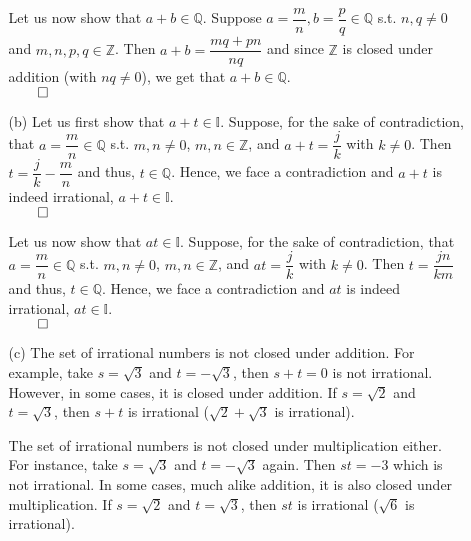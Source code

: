 \documentclass[11pt]{article}
\newcommand{\ints}{\mathbb{Z}}
\newcommand{\rats}{\mathbb{Q}}
\newcommand{\irrats}{\mathbb{I}}
\begin{document}
\begin{itemize}
\begin{itemize}
                Let us now show that $a + b \in \rats$.
                Suppose $a = \dfrac{m}{n}, b = \dfrac{p}{q} \in \rats$ s.t.
                $n, q \neq 0$ and $m, n, p, q \in \ints$. Then $a + b =
                \dfrac{mq + pn}{nq}$ and since $\ints$ is closed under addition
                (with $nq \neq 0$), we get that $a + b \in \rats$.
                \\
                $\qed$

            \item[(b)]
                Let us first show that $a + t \in \irrats$.
                Suppose, for the sake of contradiction, that $a = \dfrac{m}{n}
                \in \rats$ s.t. $m, n \neq 0$, $m, n \in \ints$, and $a + t =
                \dfrac{j}{k}$ with $k \neq 0$. Then $t = \dfrac{j}{k} -
                \dfrac{m}{n}$ and thus, $t \in \rats$. Hence, we face a
                contradiction and $a + t$ is indeed irrational, $a + t \in
                \irrats$.
                \\
                $\qed$

                Let us now show that $at \in \irrats$.
                Suppose, for the sake of contradiction, that $a = \dfrac{m}{n}
                \in \rats$ s.t. $m, n \neq 0$, $m, n \in \ints$, and $at =
                \dfrac{j}{k}$ with $k \neq 0$. Then $t = \dfrac{jn}{km}$
                and thus, $t \in \rats$. Hence, we face a contradiction and
                $at$ is indeed irrational, $at \in \irrats$.
                \\
                $\qed$

            \item[(c)]
                The set of irrational numbers is not closed under addition.
                For example, take $s = \sqrt{3}$ and $t = -\sqrt{3}$, then $s +
                t = 0$ is not irrational. However, in some cases, it is closed
                under addition. If $s = \sqrt{2}$ and $t = \sqrt{3}$, then
                $s + t$ is irrational ($\sqrt{2} + \sqrt{3}$ is irrational).

                The set of irrational numbers is not closed under
                multiplication either. For instance, take $s = \sqrt{3}$ and
                $t = -\sqrt{3}$ again. Then $st = -3$ which is not irrational.
                In some cases, much alike addition, it is also closed under
                multiplication. If $s = \sqrt{2}$ and $t = \sqrt{3}$, then $st$
                is irrational ($\sqrt{6}$ is irrational).
        \end{itemize}


\end{itemize}
\end{document}
